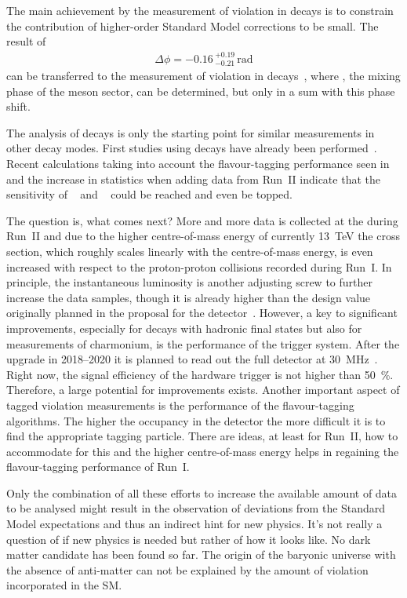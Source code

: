 The main achievement by the measurement of \CP violation in \BdToDD decays is
to constrain the contribution of higher-order Standard Model corrections to be
small. The result of
\begin{align*}
	\Delta \phi = -0.16\,^{+0.19}_{-0.21}\,\si{\radian}
\end{align*}
can be transferred to the measurement of \CP violation in \BsToDsDs
decays~\cite{LHCb-PAPER-2014-051}, where \phis, the mixing phase of the \Bs
meson sector, can be determined, but only in a sum with this phase shift.

The analysis of \BdToDD decays is only the starting point for similar
measurements in other \allBToDD decay modes. First studies using \BdToDstD
decays have already been performed~\cite{BToDstDthesis}. Recent calculations
taking into account the flavour-tagging performance seen in \BdToDD and the
increase in statistics when adding data from Run~II indicate that the
sensitivity of \babar~\cite{Aubert:2008ah} and \belle~\cite{Rohrken:2012ta}
could be reached and even be topped.

The question is, what comes next? More and more data is collected at the \lhc
during Run~II and due to the higher centre-of-mass energy of currently
\SI{13}{\TeV} the \bbbar cross section, which roughly scales linearly with the
centre-of-mass energy, is even increased with respect to the proton-proton
collisions recorded during Run~I. In principle, the instantaneous luminosity
is another adjusting screw to further increase the data samples, though it is
already higher than the design value originally planned in the proposal for
the detector~\cite{LHCb-Technical-Proposal}. However, a key to significant
improvements, especially for decays with hadronic final states but also for
measurements of charmonium, is the performance of the trigger system. After
the upgrade in 2018--2020 it is planned to read out the full detector at
\SI{30}{\mega\hertz}~\cite{LHCb-TDR-016}. Right now, the signal efficiency of
the hardware trigger is not higher than \SI{50}{\percent}. Therefore, a large
potential for improvements exists. Another important aspect of tagged \CP
violation measurements is the performance of the flavour-tagging algorithms.
The higher the occupancy in the detector the more difficult it is to find the
appropriate tagging particle. There are ideas, at least for Run~II, how to
accommodate for this and the higher centre-of-mass energy helps in regaining
the flavour-tagging performance of Run~I.

Only the combination of all these efforts to increase the available amount of
data to be analysed might result in the observation of deviations from the
Standard Model expectations and thus an indirect hint for new physics. It's
not really a question of if new physics is needed but rather of how it looks
like. No dark matter candidate has been found so far. The origin of the
baryonic universe with the absence of anti-matter can not be explained by the
amount of \CP violation incorporated in the SM.

